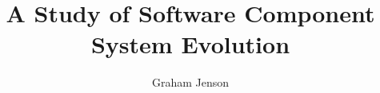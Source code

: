 \documentclass[11pt,PhD,twoside,openright]{muthesis}
\begin{document}




\title{A Study of Software Component System Evolution}
\author{Graham Jenson}

\beforeabstract

 


\newpage
\cleardoublepage
 





\newpage
\cleardoublepage

 
{}\tableofcontents
\newpage
\iftablespage
	\addvspace{10pt}
    \listoftables 
    \newpage
\fi
\iffigurespage
	\addvspace{10pt}
    \listoffigures
    \newpage
\fi

\afterpreface

\pagestyle{fancy}

\fancyhead{}
\fancyhead[LE,RO]{\slshape \leftmark}

\fancyfoot{} 
\fancyfoot[LE,RO]{\thepage} 
\renewcommand{\headrulewidth}{0.4pt}
\renewcommand{\footrulewidth}{0pt}






















\cleardoublepage
{} 
{}
  
{}
\end{document}
